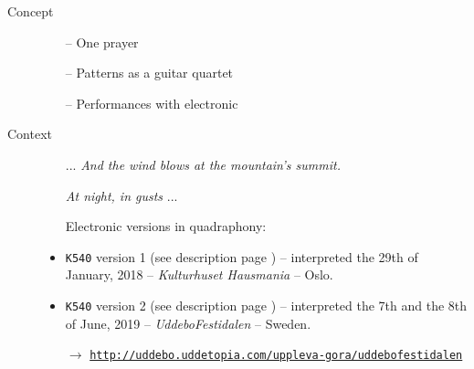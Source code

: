 \begin{description}
\item[Concept] \hfill 
\begin{itemize}
\item[--] One prayer
\item[--] Patterns as a guitar quartet
\item[--] Performances with electronic
\end{itemize}
\bigskip
\item[Context] \hfill 
\begin{itemize}
\item[] ... \textsl{And the wind blows at the mountain's summit.} 

\textsl{At night, in gusts} ...
\item[]
\item[] Electronic versions in quadraphony:
\item \texttt{K540} version 1 (see description page \pageref{k540v1}) -- interpreted the 29th of January, 2018 -- \textit{Kulturhuset Hausmania} -- Oslo.
\item \texttt{K540} version 2 (see description page \pageref{k540v2}) -- interpreted the 7th and the 8th of June, 2019 -- \textit{UddeboFestidalen} -- Sweden.

$\rightarrow$ \href{http://uddebo.uddetopia.com/uppleva-gora/uddebofestidalen}{\texttt{\small http://uddebo.uddetopia.com/uppleva-gora/uddebofestidalen}}


\end{itemize}
\end{description}
